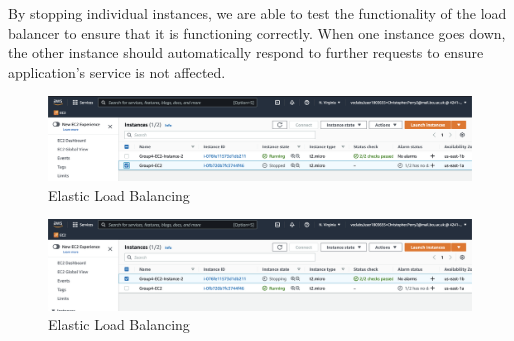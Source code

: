 By stopping individual instances, we are able to test the functionality of the load balancer to ensure that it is functioning correctly. When one instance goes down, the other instance should automatically respond to further requests to ensure application's service is not affected.
\begin{figure}[H]
	\centering
	\includegraphics[width=\textwidth]{resources/elb/elb-test-stopped-instance.png}
	\caption{Elastic Load Balancing}
	\label{fig:elb-stopped-instance}
\end{figure}\nolinebreak
\begin{figure}[H]
	\centering
	\includegraphics[width=\textwidth]{resources/elb/elb-test-stopped-instance-2.png}
	\caption{Elastic Load Balancing}
	\label{fig:elb-stopped-instance-2}
\end{figure}